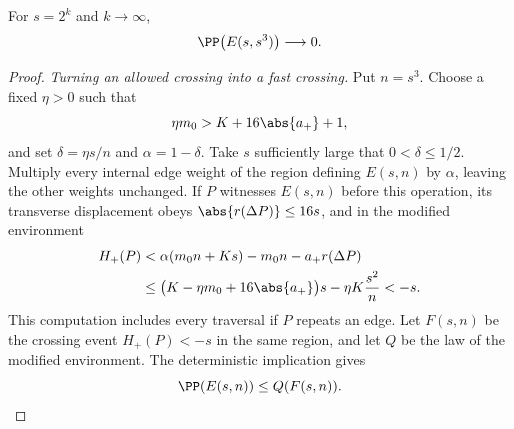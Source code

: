 \begin{lemma}\label{df:gr:tilt}
For $s=2^k$ and $k\to\infty$,
\[
 \PP\bigl(E(s,s^3)\bigr)\longrightarrow0.
\]
\end{lemma}
\begin{proof}
\emph{Turning an allowed crossing into a fast crossing.}
Put $n=s^3$. Choose a fixed $\eta>0$ such that
\[
 \eta m_0>K+16\abs{a_+}+1,
\]
and set $\delta=\eta s/n$ and $\alpha=1-\delta$. Take $s$ sufficiently
large that $0<\delta\le1/2$. Multiply every internal edge weight of the
region defining $E(s,n)$ by $\alpha$, leaving the other weights
unchanged. If $P$ witnesses $E(s,n)$ before this operation, its
transverse displacement obeys $\abs{r(\Delta P)}\le16s$, and in the
modified environment
\[
 \begin{split}
 H_+(P)
 &<\alpha(m_0n+Ks)-m_0n-a_+r(\Delta P)\\
 &\le \bigl(K-\eta m_0+16\abs{a_+}\bigr)s
          -\eta K\frac{s^2}{n}<-s.
 \end{split}
\]
This computation includes every traversal if $P$ repeats an edge.
Let $F(s,n)$ be the crossing event $H_+(P)<-s$ in the same region, and
let $Q$ be the law of the modified environment. The deterministic
implication gives
\begin{equation}\label{df:eq:gr-tilt-implication}
 \PP(E(s,n))\le Q(F(s,n)).
\end{equation}


\end{proof}
